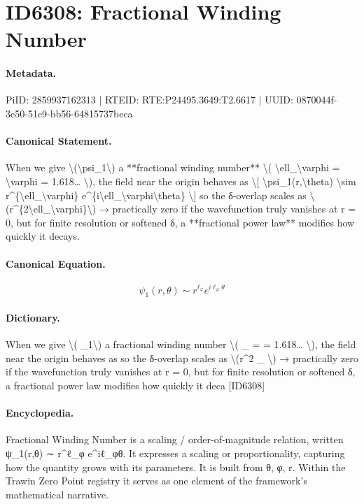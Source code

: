 \section*{ID6308: Fractional Winding Number}
\paragraph{Metadata.}
PiID: 2859937162313 | RTEID: RTE:P24495.3649:T2.6617 | UUID: 0870044f-3e50-51e9-bb56-64815737beca

\paragraph{Canonical Statement.}
When we give \textbackslash{}(\textbackslash{}psi\_1\textbackslash{}) a **fractional winding number** \textbackslash{}( \textbackslash{}ell\_\textbackslash{}varphi = \textbackslash{}varphi = 1.618… \textbackslash{}), the field near the origin behaves as \textbackslash{}[ \textbackslash{}psi\_1(r,\textbackslash{}theta) \textbackslash{}sim r\textasciicircum{}\{\textbackslash{}ell\_\textbackslash{}varphi\} e\textasciicircum{}\{i\textbackslash{}ell\_\textbackslash{}varphi\textbackslash{}theta\} \textbackslash{}] so the δ-overlap scales as \textbackslash{}(r\textasciicircum{}\{2\textbackslash{}ell\_\textbackslash{}varphi\}\textbackslash{}) → practically zero if the wavefunction truly vanishes at r = 0, but for finite resolution or softened δ, a **fractional power law** modifies how quickly it decays.

\paragraph{Canonical Equation.}
\[
\psi_1(r,\theta) \sim r^{\ell_\varphi} e^{i\ell_\varphi\theta}
\]

\paragraph{Dictionary.}
When we give \textbackslash{}( \_1\textbackslash{}) a fractional winding number \textbackslash{}( \_ = = 1.618… \textbackslash{}), the field near the origin behaves as so the δ-overlap scales as \textbackslash{}(r\textasciicircum{}2 \_ \textbackslash{}) → practically zero if the wavefunction truly vanishes at r = 0, but for finite resolution or softened δ, a fractional power law modifies how quickly it deca [ID6308]

\paragraph{Encyclopedia.}
Fractional Winding Number is a scaling / order-of-magnitude relation, written ψ\_1(r,θ) ∼ r\textasciicircum{}ℓ\_φ e\textasciicircum{}iℓ\_φθ. It expresses a scaling or proportionality, capturing how the quantity grows with its parameters. It is built from θ, φ, r. Within the Trawin Zero Point registry it serves as one element of the framework's mathematical narrative.
